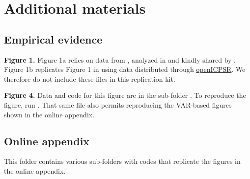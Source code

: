 \documentclass[12pt]{article}
\theoremstyle{plain}
\begin{document}
\section{Additional materials}
\subsection{Empirical evidence}
\textbf{Figure 1.} Figure 1a relies on data from \citet{fagerengMPCHeterogeneityHousehold2018}, analyzed in and kindly shared by \citet{auclertIntertemporalKeynesianCross2018}. Figure 1b replicates Figure 1 in \citet{jappelliFiscalPolicyMPC2014} using data distributed through \href{http://doi.org/10.3886/E116432V1}{openICPSR}. We therefore do not include these files in this replication kit.

\textbf{Figure 4.} Data and code for this figure are in the sub-folder . To reproduce the figure, run  . That same file also permits reproducing the VAR-based figures shown in the online appendix.

\subsection{Online appendix}
This folder contains various sub-folders with codes that replicate the figures in the online appendix.
\renewcommand\refname{References for documentation}
           
     
\end{document}
